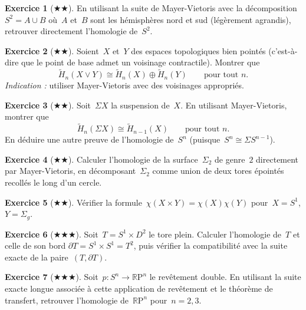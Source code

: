 \documentclass[12pt,a4paper,openany]{book}
\theoremstyle{definition}
\newtheorem{exercice}{Exercice}[chapter]
\theoremstyle{plain}
\theoremstyle{remark}
\newcommand{\RP}{\mathbb{R}\mathrm{P}}
\begin{document}
\begin{exercice}[$\bigstar\bigstar$]\label{exo:mv-s2}
En utilisant la suite de Mayer-Vietoris avec la décomposition~$S^2 = A \cup B$ où~$A$ et~$B$
sont les hémisphères nord et sud (légèrement agrandis), retrouver directement
l'homologie de~$S^2$.
\end{exercice}

\begin{exercice}[$\bigstar\bigstar$]\label{exo:mv-wedge}
Soient~$X$ et~$Y$ des espaces topologiques bien pointés (c'est-à-dire
que le point de base admet un voisinage contractile). Montrer que
\[
  \widetilde{H}_n(X \vee Y) \cong \widetilde{H}_n(X) \oplus \widetilde{H}_n(Y)
  \qquad \text{pour tout } n.
\]
\emph{Indication :} utiliser Mayer-Vietoris avec des voisinages appropriés.
\end{exercice}

\begin{exercice}[$\bigstar\bigstar$]\label{exo:mv-suspension}
Soit~$\Sigma X$ la suspension de~$X$. En utilisant
Mayer-Vietoris, montrer que
\[
  \widetilde{H}_n(\Sigma X) \cong \widetilde{H}_{n-1}(X)
  \qquad \text{pour tout } n.
\]
En déduire une autre preuve de l'homologie de~$S^n$ (puisque~$S^n \cong \Sigma S^{n-1}$).
\end{exercice}

\begin{exercice}[$\bigstar\bigstar$]\label{exo:mv-genus2}
Calculer l'homologie de la surface~$\Sigma_2$ de genre~$2$ directement par Mayer-Vietoris,
en décomposant~$\Sigma_2$ comme union de deux tores épointés recollés le long d'un cercle.
\end{exercice}

\begin{exercice}[$\bigstar\bigstar$]\label{exo:euler-produit}
Vérifier la formule~$\chi(X \times Y) = \chi(X)\chi(Y)$ pour~$X = S^1$, $Y = \Sigma_g$.
\end{exercice}

\begin{exercice}[$\bigstar\bigstar\bigstar$]\label{exo:mv-tore-plein}
Soit~$T = S^1 \times D^2$ le tore plein. Calculer l'homologie de~$T$ et celle de son bord
$\partial T = S^1 \times S^1 = T^2$, puis vérifier la compatibilité avec la suite exacte
de la paire~$(T, \partial T)$.
\end{exercice}

\begin{exercice}[$\bigstar\bigstar\bigstar$]\label{exo:mv-revetement}
Soit~$p \colon S^n \to \RP^n$ le revêtement double. En utilisant la suite exacte longue
associée à cette application de revêtement et le théorème de transfert, retrouver
l'homologie de~$\RP^n$ pour~$n = 2, 3$.
\end{exercice}
\end{document}
